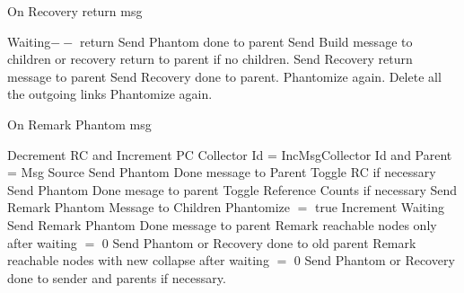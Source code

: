 \documentclass{article}
\begin{document}
\begin{algorithm}
\caption{On Recovery return msg}
\label{Recovery return message received}
\begin{algorithmic}[1]
\State Waiting$--$
\State return
\EndIf
{} 
\State Send Phantom done to parent
\Else
{}
\State Send Build message to children or recovery return to parent if no children.
\State Send Recovery return message to parent
\Else 
\State Send Recovery done to parent.
\State Phantomize again.
\EndIf
{}
\State Delete all the outgoing links
\Else
\State Phantomize again.
\EndIf
\EndIf 
\EndProcedure
\end{algorithmic}
\end{algorithm}	

\begin{algorithm}
\caption{On Remark Phantom msg}
\label{Remark Phantom message received}
\begin{algorithmic}[1]
\State Decrement RC and Increment PC
\State Collector Id = IncMsgCollector Id and Parent = Msg Source
\State Send Phantom Done message to Parent
\State Toggle RC if necessary
\State Send Phantom Done mesage to parent
\Else
\State Toggle Reference Counts if necessary
\State Send Remark Phantom Message to Children
\State Phantomize $=$ true
\State Increment Waiting
\EndIf
{}
\State Send Remark Phantom Done message to parent
\State Remark reachable nodes only after waiting $=$ 0
\State Send Phantom or Recovery done to old parent
\Else
\State Remark reachable nodes with new collapse after waiting $=$ 0
\State Send Phantom or Recovery done to sender and parents if necessary.
\EndIf
\EndProcedure
\end{algorithmic}
\end{algorithm}	
\end{document}
